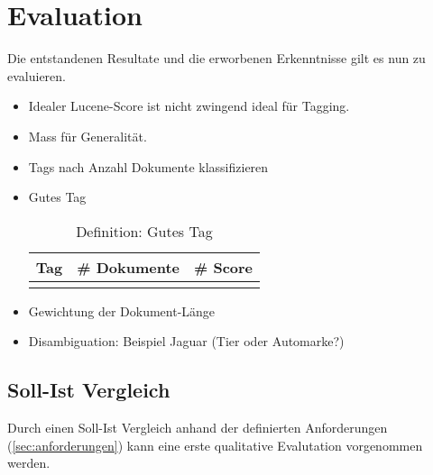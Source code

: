 \chapter{Evaluation}

Die entstandenen Resultate und die erworbenen Erkenntnisse gilt es nun zu evaluieren.

\begin{itemize}
    \item Idealer Lucene-Score ist nicht zwingend ideal für Tagging.
    \item Mass für Generalität.
    \item Tags nach Anzahl Dokumente klassifizieren
    \item Gutes Tag
    
    \begin{longtable}{|p{4cm}| p{4cm}| p{4cm}|}
  \hline
    \textbf{Tag} & \textbf{\# Dokumente}& \textbf{\# Score}\\\hline
        \caption{Definition: Gutes Tag}
    \label{gutes-tag}
\end{longtable}
    \item Gewichtung der Dokument-Länge
    \item Disambiguation: Beispiel Jaguar (Tier oder Automarke?)
    
\end{itemize}

\section{Soll-Ist Vergleich}

Durch einen Soll-Ist Vergleich anhand der definierten Anforderungen (\autoref{sec:anforderungen}) kann eine erste qualitative Evalutation vorgenommen werden.  

